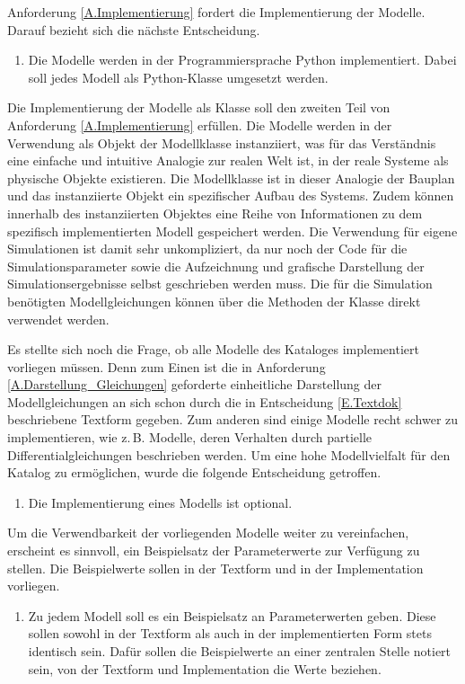 Anforderung \ref{A.Implementierung} fordert die Implementierung der Modelle. Darauf bezieht sich die nächste Entscheidung.
\begin{enumerate}[resume*]
	\item \label{E.Implementation}Die Modelle werden in der Programmiersprache Python implementiert. Dabei soll jedes Modell als Python-Klasse umgesetzt werden.
\end{enumerate}
Die Implementierung der Modelle als Klasse soll den zweiten Teil von Anforderung \ref{A.Implementierung} erfüllen. Die Modelle werden in der Verwendung als Objekt der Modellklasse instanziiert, was für das Verständnis eine einfache und intuitive Analogie zur realen Welt ist, in der reale Systeme als physische Objekte existieren. Die Modellklasse ist in dieser Analogie der Bauplan und das instanziierte Objekt ein spezifischer Aufbau des Systems. Zudem können innerhalb des instanziierten Objektes eine Reihe von Informationen zu dem spezifisch implementierten Modell gespeichert werden. Die Verwendung für eigene Simulationen ist damit sehr unkompliziert, da nur noch der Code für die Simulationsparameter sowie die Aufzeichnung und grafische Darstellung der Simulationsergebnisse selbst geschrieben werden muss. Die für die Simulation benötigten Modellgleichungen können über die Methoden der Klasse direkt verwendet werden.

Es stellte sich noch die Frage, ob alle Modelle des Kataloges implementiert vorliegen müssen. Denn zum Einen ist die in Anforderung \ref{A.Darstellung_Gleichungen} geforderte einheitliche Darstellung der Modellgleichungen an sich schon durch die in Entscheidung \ref{E.Textdok} beschriebene Textform gegeben. Zum anderen sind einige Modelle recht schwer zu implementieren, wie z.\,B. Modelle, deren Verhalten durch partielle Differentialgleichungen beschrieben werden. Um eine hohe Modellvielfalt für den Katalog zu ermöglichen, wurde die folgende Entscheidung getroffen.
\begin{enumerate}[resume*]
	\item \label{E.ImplementierungOptional}Die Implementierung eines Modells ist optional.
\end{enumerate}

Um die Verwendbarkeit der vorliegenden Modelle weiter zu vereinfachen, erscheint es sinnvoll, ein Beispielsatz der Parameterwerte zur Verfügung zu stellen. Die Beispielwerte sollen in der Textform und in der Implementation vorliegen.
\begin{enumerate}[resume*]
	\item \label{E.Parameterwerte}Zu jedem Modell soll es ein Beispielsatz an Parameterwerten geben. Diese sollen sowohl in der Textform als auch in der implementierten Form stets identisch sein. Dafür sollen die Beispielwerte an einer zentralen Stelle notiert sein, von der Textform und Implementation die Werte beziehen.
\end{enumerate}

